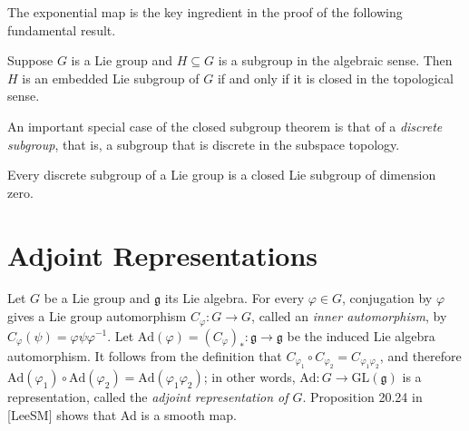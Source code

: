 The exponential map is the key ingredient in the proof of the following fundamental result.

\begin{theorem}
\label{thm:closed-subgroup-theorem}

Suppose $G$ is a Lie group and $H \subseteq G$ is a subgroup in the algebraic sense. Then $H$ is an embedded Lie subgroup of $G$ if and only if it is closed in the topological sense.
\end{theorem}

An important special case of the closed subgroup theorem is that of a \emph{discrete subgroup}, that is, a subgroup that is discrete in the subspace topology.

\begin{proposition}
\label{prop:discrete-subgroups-dimension-zero}

Every discrete subgroup of a Lie group is a closed Lie subgroup of dimension zero.
\end{proposition}

\section{Adjoint Representations}

Let $G$ be a Lie group and $\mathfrak{g}$ its Lie algebra. For every $\varphi \in G$, conjugation by $\varphi$ gives a Lie group automorphism $C_\varphi: G \to G$, called an \emph{inner automorphism}, by $C_\varphi(\psi) = \varphi\psi\varphi^{-1}$. Let $\text{Ad}(\varphi) = (C_\varphi)_*: \mathfrak{g} \to \mathfrak{g}$ be the induced Lie algebra automorphism. It follows from the definition that $C_{\varphi_1} \circ C_{\varphi_2} = C_{\varphi_1\varphi_2}$, and therefore $\text{Ad}(\varphi_1) \circ \text{Ad}(\varphi_2) = \text{Ad}(\varphi_1\varphi_2)$; in other words, $\text{Ad}: G \to \text{GL}(\mathfrak{g})$ is a representation, called the \emph{adjoint representation of $G$}. Proposition 20.24 in [LeeSM] shows that Ad is a smooth map.

